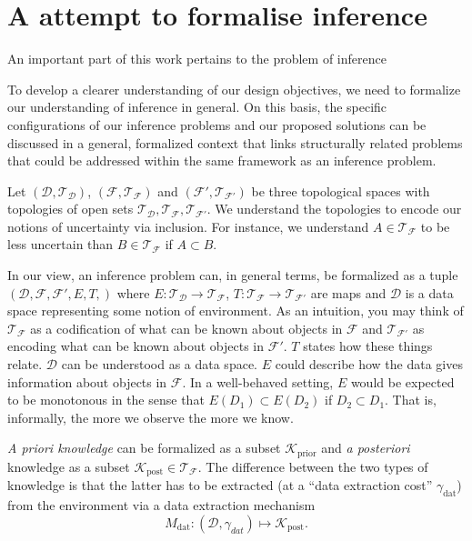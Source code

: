 \section{A attempt to formalise inference}
An important part of this work pertains to the problem of inference 

To develop a clearer understanding of our design objectives, we need to formalize our understanding of inference in general. On this basis, the specific configurations of our inference problems and our proposed solutions can be discussed in a general, formalized context that links structurally related problems that could be addressed within the same framework as an inference problem. 

Let $(\mathcal D, \mathcal T_{\mathcal D})$, $(\mathcal F, \mathcal T_{\mathcal F})$ and $(\mathcal F', \mathcal T_{\mathcal F'})$ be three topological spaces with topologies of open sets $\mathcal T_{\mathcal D},\mathcal T_{\mathcal F},\mathcal T_{\mathcal F'}$.
We understand the topologies to encode our notions of uncertainty via inclusion. For instance, we understand $A \in \mathcal T_{\mathcal F} $ to be less uncertain than $B \in \mathcal T_{\mathcal F} $ if $A \subset B$.


In our view, an inference problem can, in general terms, be formalized as a tuple $(\mathcal D, \mathcal F, \mathcal F', E,T, )$ where $E: \mathcal T_{\mathcal D} \to \mathcal T_{\mathcal F}$, $T: \mathcal T_{\mathcal F} \to \mathcal T_{\mathcal F'}$ are maps and $\mathcal D$ is a data space representing some notion of environment. As an intuition, you may think of $\mathcal T_{\mathcal F}$ as a codification of what can be known about objects in $\mathcal F$ and $\mathcal T_{\mathcal F'}$ as encoding what can be known about objects in $\mathcal F'$. $T$ states how these things relate. $\mathcal D$ can be understood as a data space.
$E$ could describe how the data gives information about objects in $\mathcal F$. In a well-behaved setting, $E$ would be expected to be monotonous in the sense that $E(D_1) \subset E(D_2)$ if $D_2 \subset D_1$. That is, informally, the more we observe the more we know. 

\textit{A priori knowledge} can be formalized as a subset $\mathcal K_{\text{prior}} $ and \textit{a posteriori} knowledge as a subset $\mathcal K_{\text{post}}\in \mathcal T_{\mathcal F}$. The difference between the two types of knowledge is that the latter has to be extracted (at a ``data extraction cost'' $\gamma_{\text{dat}}$) from the environment via a data extraction mechanism \[M_{\text{dat}}: (\mathcal D,\gamma_{dat}) \mapsto \mathcal K_{\text{post}}.\] 

